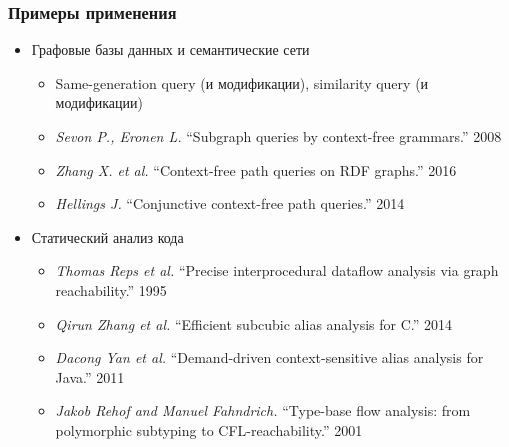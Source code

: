 \documentclass[xcolor=table]{beamer}
\begin{document}
\begin{frame}[fragile]
  \transwipe[direction=90]
  \frametitle{Примеры применения}
  \begin{itemize}
  \item Графовые базы данных и семантические сети
    \begin{itemize}
        \item Same-generation query (и модификации), similarity query (и модификации)
        \item \emph{Sevon P., Eronen L.} ``Subgraph queries by context-free grammars.'' 2008
        \item \emph{Zhang X. et al.} ``Context-free path queries on RDF graphs.'' 2016
        \item \emph{Hellings J.} ``Conjunctive context-free path queries.'' 2014
    \end{itemize}
    \item Статический анализ кода
    \begin{itemize}
        \item \emph{Thomas Reps et al.} ``Precise interprocedural dataflow analysis via graph reachability.'' 1995 
        \item \emph{Qirun Zhang et al.}  ``Efficient subcubic alias analysis for C.'' 2014
        \item \emph{Dacong Yan et al.} ``Demand-driven context-sensitive alias analysis for Java.'' 2011
        \item \emph{Jakob Rehof and Manuel Fahndrich.} ``Type-base flow analysis: from polymorphic subtyping to CFL-reachability.'' 2001
    \end{itemize}

  \end{itemize}

\end{frame}
\end{document}
